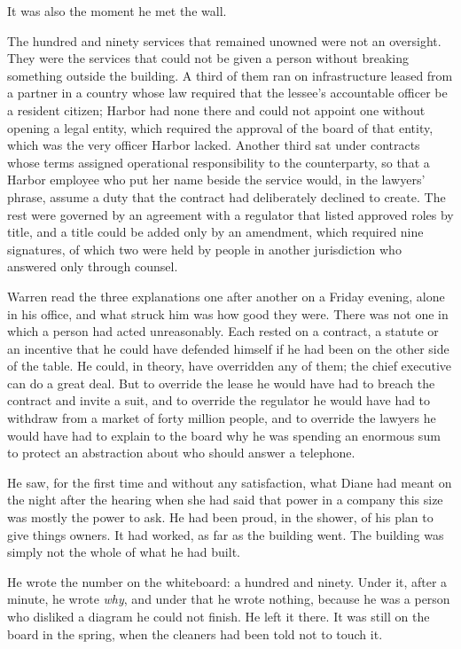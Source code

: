 It was also the moment he met the wall.

The hundred and ninety services that remained unowned were not an oversight. They were the services that could not be given a person without breaking something outside the building. A third of them ran on infrastructure leased from a partner in a country whose law required that the lessee's accountable officer be a resident citizen; Harbor had none there and could not appoint one without opening a legal entity, which required the approval of the board of that entity, which was the very officer Harbor lacked. Another third sat under contracts whose terms assigned operational responsibility to the counterparty, so that a Harbor employee who put her name beside the service would, in the lawyers' phrase, assume a duty that the contract had deliberately declined to create. The rest were governed by an agreement with a regulator that listed approved roles by title, and a title could be added only by an amendment, which required nine signatures, of which two were held by people in another jurisdiction who answered only through counsel.

Warren read the three explanations one after another on a Friday evening, alone in his office, and what struck him was how good they were. There was not one in which a person had acted unreasonably. Each rested on a contract, a statute or an incentive that he could have defended himself if he had been on the other side of the table. He could, in theory, have overridden any of them; the chief executive can do a great deal. But to override the lease he would have had to breach the contract and invite a suit, and to override the regulator he would have had to withdraw from a market of forty million people, and to override the lawyers he would have had to explain to the board why he was spending an enormous sum to protect an abstraction about who should answer a telephone.

He saw, for the first time and without any satisfaction, what Diane had meant on the night after the hearing when she had said that power in a company this size was mostly the power to ask. He had been proud, in the shower, of his plan to give things owners. It had worked, as far as the building went. The building was simply not the whole of what he had built.

He wrote the number on the whiteboard: a hundred and ninety. Under it, after a minute, he wrote \emph{why}, and under that he wrote nothing, because he was a person who disliked a diagram he could not finish. He left it there. It was still on the board in the spring, when the cleaners had been told not to touch it.

